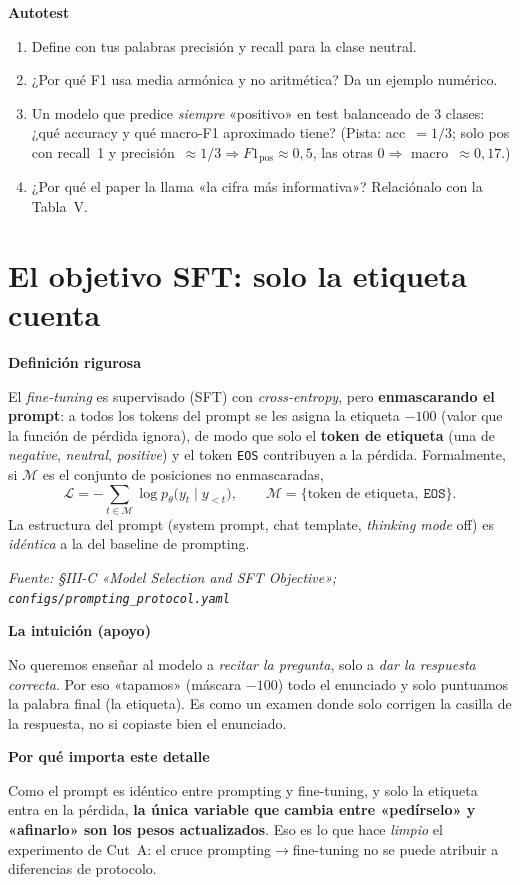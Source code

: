 \documentclass[11pt,a4paper]{article}
\newcommand{\nivel}[1]{\medskip\noindent\textbf{\textcolor{blue!45!black}{#1}}\par\nopagebreak\smallskip}
\newcommand{\fuente}[1]{\nopagebreak\par\hfill{\footnotesize\textit{Fuente: #1}}\par}
\begin{document}
\nivel{Autotest}
\begin{enumerate}[nosep]
  \item Define con tus palabras precisión y recall para la clase neutral.
  \item ¿Por qué F1 usa media armónica y no aritmética? Da un ejemplo numérico.
  \item Un modelo que predice \emph{siempre} «positivo» en test balanceado de 3 clases: ¿qué
        accuracy y qué macro-F1 aproximado tiene? (Pista: acc~$=1/3$; solo pos con recall~1 y
        precisión~$\approx1/3 \Rightarrow F1_{\text{pos}}\approx0{,}5$, las otras $0 \Rightarrow$
        macro~$\approx0{,}17$.)
  \item ¿Por qué el paper la llama «la cifra más informativa»? Relaciónalo con la Tabla~V.
\end{enumerate}

\section{El objetivo SFT: solo la etiqueta cuenta}\label{sec:sft}

\nivel{Definición rigurosa}
El \emph{fine-tuning} es supervisado (SFT) con \emph{cross-entropy}, pero \textbf{enmascarando el
prompt}: a todos los tokens del prompt se les asigna la etiqueta $-100$ (valor que la función de
pérdida ignora), de modo que solo el \textbf{token de etiqueta} (una de \emph{negative},
\emph{neutral}, \emph{positive}) y el token \texttt{EOS} contribuyen a la pérdida. Formalmente, si
$\mathcal{M}$ es el conjunto de posiciones no enmascaradas,
\[
\mathcal{L} = -\!\!\sum_{t \in \mathcal{M}} \log p_\theta\big(y_t \mid y_{<t}\big),
\qquad \mathcal{M} = \{\text{token de etiqueta},\ \texttt{EOS}\}.
\]
La estructura del prompt (system prompt, chat template, \emph{thinking mode} off) es \emph{idéntica}
a la del baseline de prompting.
\fuente{\S III-C «Model Selection and SFT Objective»; \texttt{configs/prompting\_protocol.yaml}}

\nivel{La intuición (apoyo)}
No queremos enseñar al modelo a \emph{recitar la pregunta}, solo a \emph{dar la respuesta correcta}.
Por eso «tapamos» (máscara $-100$) todo el enunciado y solo puntuamos la palabra final
(la etiqueta). Es como un examen donde solo corrigen la casilla de la respuesta, no si copiaste bien
el enunciado.

\nivel{Por qué importa este detalle}
Como el prompt es idéntico entre prompting y fine-tuning, y solo la etiqueta entra en la pérdida,
\textbf{la única variable que cambia entre «pedírselo» y «afinarlo» son los pesos actualizados}. Eso
es lo que hace \emph{limpio} el experimento de Cut~A: el cruce prompting$\to$fine-tuning no se puede
atribuir a diferencias de protocolo.
\end{document}

